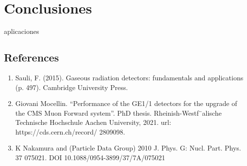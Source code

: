 \documentclass{article}
\begin{document}
\section{Conclusiones}
\newpage



\noindent aplicaciones

\subsection*{References}
\begin{enumerate}
    \item Sauli, F. (2015). Gaseous radiation detectors: fundamentals and applications (p. 497). Cambridge University Press.
    \item Giovani Mocellin. “Performance of the GE1/1 detectors for the upgrade of the
    CMS Muon Forward system”. PhD thesis. Rheinish-Westf¨alische Technische
    Hochschule Aachen University, 2021. url: https://cds.cern.ch/record/
    2809098.
    \item K Nakamura and (Particle Data Group) 2010 J. Phys. G: Nucl. Part. Phys. 37 075021. DOI 10.1088/0954-3899/37/7A/075021
\end{enumerate}


\newpage



\end{document}
